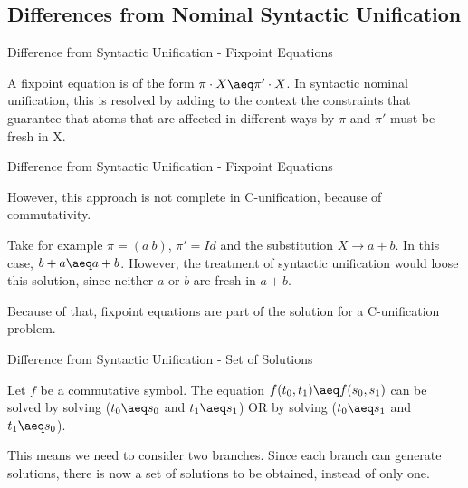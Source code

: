 \subsection{Differences from Nominal Syntactic Unification}
\begin{frame}{Difference from Syntactic Unification - Fixpoint Equations}
     \par A fixpoint equation is of the form $ \pi \cdot X \aeq \pi' \cdot X$. In syntactic nominal
     unification, this is resolved by adding to the context the constraints that
     guarantee that 
     atoms that are affected in different ways by $\pi$ and $\pi'$ must be fresh in
     X.  
\end{frame}
\begin{frame}{Difference from Syntactic Unification - Fixpoint Equations}
     \par However, this approach is not complete in C-unification, because of
     commutativity. 
     \par Take for example $\pi = (a \ b)$, $\pi' = Id$ and the
     substitution $X \rightarrow a+b$. In this case, $b + a \aeq a+b$. However,
     the treatment of syntactic unification would loose this solution, since neither
     $a$ or $b$ are fresh in $a+b$. 
     \par Because of that, fixpoint equations are part of the solution for a
     C-unification problem. 
\end{frame}

\begin{frame}{Difference from Syntactic Unification - Set of Solutions}
    \par Let $f$ be a commutative symbol. The equation $f(t_0, t_1) \aeq f(s_0, s_1)$
    can be solved by solving ($t_0 \aeq s_0$ and $t_1 \aeq s_1$) OR by solving 
    ($t_0 \aeq s_1$ and $t_1 \aeq s_0$). 
    \newline
    \par This means we need to consider two branches. Since each branch can generate
    solutions, there is now a set of solutions to be obtained, instead of only one.  
\end{frame}


